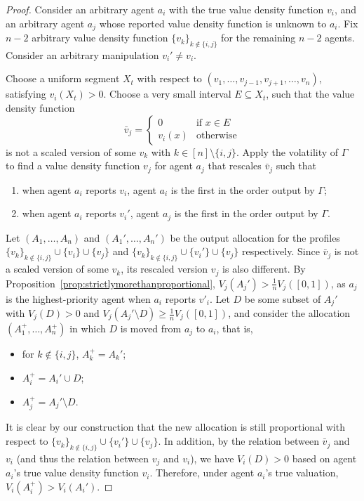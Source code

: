 \begin{proof}
Consider an arbitrary agent $a_i$ with the true value density function $v_i$, and an arbitrary agent $a_j$ whose reported value density function is unknown to $a_i$.
Fix $n-2$ arbitrary value density function $\{v_k\}_{k\notin\{i,j\}}$ for the remaining $n-2$ agents.
Consider an arbitrary manipulation $v_i'\neq v_i$.

Choose a uniform segment $X_t$ with respect to $(v_1,\ldots,v_{j-1},v_{j+1},\ldots,v_n)$,
satisfying $v_i(X_t)>0$.
Choose a very small interval $E\subseteq X_t$, such that the value density function
$$\bar{v}_j=\left\{\begin{array}{ll}
    0 & \mbox{if }x\in E \\
    v_i(x) & \mbox{otherwise}
\end{array}\right.$$
is not a scaled version of some $v_k$ with $k\in[n]\setminus\{i,j\}$.
Apply the volatility of $\Gamma$ to find a value density function $v_j$ for agent $a_j$ that rescales $\bar{v}_j$ such that
\begin{enumerate}
    \item when agent $a_i$ reports $v_i$, agent $a_i$ is the first in the order output by $\Gamma$;
    \item when agent $a_i$ reports $v_i'$, agent $a_j$ is the first in the order output by $\Gamma$.
\end{enumerate}

Let $(A_1,\ldots,A_n)$ and $(A_1',\ldots,A_n')$ be the output allocation for the profiles $\{v_k\}_{k\notin\{i,j\}}\cup\{v_i\}\cup\{v_j\}$ and $\{v_k\}_{k\notin\{i,j\}}\cup\{v_i'\}\cup\{v_j\}$ respectively.
Since $\bar{v}_j$ is not a scaled version of some $v_k$, its rescaled version $v_j$ is also different.
By Proposition~\ref{prop:strictlymorethanproportional}, $V_j(A_j')>\frac1nV_j([0,1])$,
as $a_j$ is the highest-priority agent when $a_i$ reports $v'_i$.
Let $D$ be some subset of $A_j'$ with $V_j(D)>0$ and $V_j(A_j'\setminus D)\geq\frac1nV_j([0,1])$, and consider the allocation $(A_1^+,\ldots,A_n^+)$ in which $D$ is moved from $a_j$ to $a_i$, that is,
\begin{itemize}
    \item for $k\notin\{i,j\}$, $A_k^+=A_k'$;
    \item $A_i^+=A_i'\cup D$;
    \item $A_j^+=A_j'\setminus D$.
\end{itemize}
It is clear by our construction that the new allocation is still proportional with respect to $\{v_k\}_{k\notin\{i,j\}}\cup\{v_i'\}\cup\{v_j\}$.
In addition, by the relation between $\bar{v}_j$ and $v_i$ (and thus the relation between $v_j$ and $v_i$), we have $V_i(D)>0$ based on agent $a_i$'s true value density function $v_i$.
Therefore, under agent $a_i$'s true valuation, $V_i(A_i^+)>V_i(A_i')$.


\end{proof}
